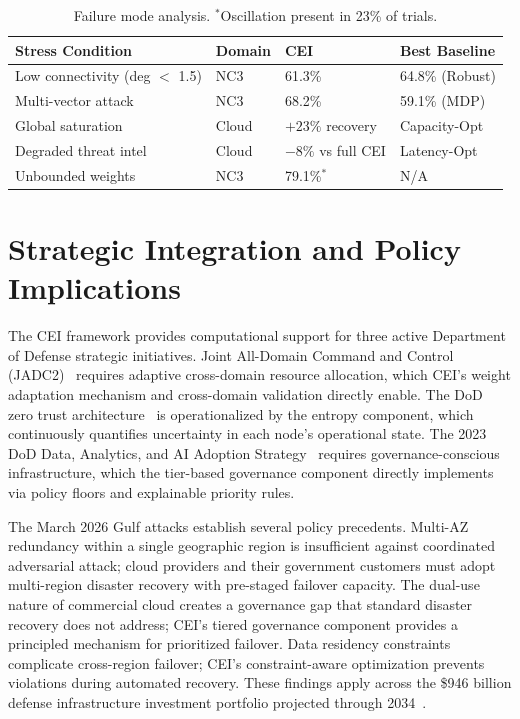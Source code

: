 \documentclass[runningheads]{llncs}
\begin{document}
\begin{table}[ht]
\caption{Failure mode analysis. $^*$Oscillation present in 23\% of trials.}
\label{tab:failure}
\centering
\small
\begin{tabular}{p{4.5cm}lll}
\toprule
Stress Condition & Domain & CEI & Best Baseline \\
\midrule
Low connectivity (deg $<$ 1.5) & NC3   & 61.3\%             & 64.8\% (Robust) \\
Multi-vector attack            & NC3   & 68.2\%             & 59.1\% (MDP) \\
Global saturation              & Cloud & $+23\%$ recovery   & Capacity-Opt \\
Degraded threat intel          & Cloud & $-8\%$ vs full CEI & Latency-Opt \\
Unbounded weights              & NC3   & 79.1\%$^*$         & N/A \\
\bottomrule
\end{tabular}
\end{table}

\section{Strategic Integration and Policy Implications}
\label{sec:strategic}

The CEI framework provides computational support for three active Department of Defense strategic initiatives. Joint All-Domain Command and Control (JADC2)~\cite{jadc2} requires adaptive cross-domain resource allocation, which CEI's weight adaptation mechanism and cross-domain validation directly enable. The DoD zero trust architecture~\cite{gao_it} is operationalized by the entropy component, which continuously quantifies uncertainty in each node's operational state. The 2023 DoD Data, Analytics, and AI Adoption Strategy~\cite{dod_ai} requires governance-conscious infrastructure, which the tier-based governance component directly implements via policy floors and explainable priority rules.

The March 2026 Gulf attacks establish several policy precedents. Multi-AZ redundancy within a single geographic region is insufficient against coordinated adversarial attack; cloud providers and their government customers must adopt multi-region disaster recovery with pre-staged failover capacity. The dual-use nature of commercial cloud creates a governance gap that standard disaster recovery does not address; CEI's tiered governance component provides a principled mechanism for prioritized failover. Data residency constraints complicate cross-region failover; CEI's constraint-aware optimization prevents violations during automated recovery. These findings apply across the \$946 billion defense infrastructure investment portfolio projected through 2034~\cite{cbo}.
\end{document}
